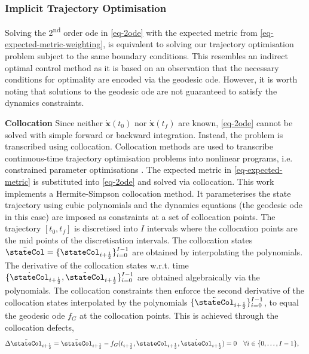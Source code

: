 \documentclass{mimosis-class/mimosis}
\numberwithin{equation}{chapter}
\begin{document}
{\subsubsection{Implicit Trajectory Optimisation}
\label{sec:org5423fad}
Solving the 2\textsuperscript{nd} order \acrshort{ode} in \cref{eq-2ode} with the expected metric from \cref{eq-expected-metric-weighting},
is equivalent to solving our trajectory optimisation problem subject to the same boundary conditions.
This resembles an indirect optimal control method as it is based on an observation that the
necessary conditions for optimality are encoded via the geodesic \acrshort{ode}.
However, it is worth noting that solutions to the geodesic \acrshort{ode} are not guaranteed to satisfy the
dynamics constraints.


\textbf{Collocation}
Since neither \(\dot{\mathbf{x}}(t_0)\) nor \(\dot{\mathbf{x}}(t_f)\) are known, \cref{eq-2ode} cannot
be solved with simple forward or backward integration.
Instead, the problem is transcribed using collocation.
Collocation methods are used to transcribe continuous-time trajectory optimisation problems into
nonlinear programs, i.e. constrained parameter optimisations \citep{kellyIntroduction2017,fahrooDirect2000}.
The expected metric in \cref{eq-expected-metric} is substituted into \cref{eq-2ode} and solved via collocation.
This work implements a Hermite-Simpson collocation method.
It parameterises the state trajectory using cubic polynomials and the dynamics equations (the geodesic \acrshort{ode} in this case)
are imposed as constraints at a set of collocation points.
The trajectory \([t_0, t_f]\) is discretised into \(I\) intervals where the collocation points
are the mid points of the discretisation intervals.
The collocation states
\(\bar{\stateCol} = \{\stateCol_{i+\frac{1}{2}}\}_{i=0}^{I-1}\)
are obtained by interpolating the polynomials.
The derivative of the collocation states w.r.t. time
\(\{\dot{\stateCol}_{i+\frac{1}{2}}, \ddot{\stateCol}_{i+\frac{1}{2}}\}_{i=0}^{I-1}\)
are obtained algebraically via the polynomials.
The collocation constraints then enforce
the second derivative of the collocation states interpolated by the polynomials \(\{\ddot{\stateCol}_{i+\frac{1}{2}} \}_{i=0}^{I-1}\),
to equal the geodesic \acrshort{ode} \(f_G\) at the collocation points.
This is achieved through the collocation defects,
\begin{align} \label{eq-defect}
\Delta\ddot{\stateCol}_{i+\frac{1}{2}} &= \ddot{\stateCol}_{i+\frac{1}{2}} - f_G(t_{i+\frac{1}{2}}, \stateCol_{i+\frac{1}{2}}, \dot{\stateCol}_{i+\frac{1}{2}}) = 0 \quad \forall i \in  \{ 0, \ldots, I-1\},

\end{align}}
\end{document}
